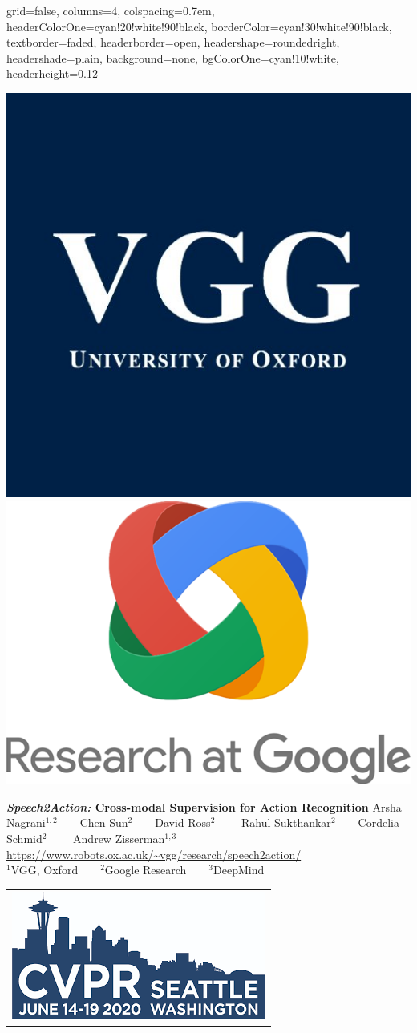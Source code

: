 \documentclass[landscape,a0paper,fontscale=0.292]{baposter}
\begin{document}
\begin{poster}{
 grid=false,
 columns=4,
 colspacing=0.7em,
 headerColorOne=cyan!20!white!90!black,
 borderColor=cyan!30!white!90!black,
 textborder=faded,
 headerborder=open,
 headershape=roundedright,
 headershade=plain,
 background=none,
 bgColorOne=cyan!10!white,
 headerheight=0.12\textheight}
 {
      \includegraphics[width=0.07\linewidth]{VGG_logo.jpg}
      \makebox[0.005\textwidth]{} 
      \includegraphics[width=0.08\linewidth]{Google_Research.png}
      
    
 }
 {\sc\huge\bf \textit{Speech2Action:} Cross-modal Supervision for Action Recognition}
 {Arsha Nagrani$^{1,2}$~~~~Chen Sun$^2$~~~~David Ross$^2$ ~~~~Rahul Sukthankar$^2$~~~~Cordelia Schmid$^{2}$ ~~~~Andrew Zisserman$^{1,3}$ \\[0.2em]
 \small{\url{https://www.robots.ox.ac.uk/~vgg/research/speech2action/}}\\[0.2em]
$^1$VGG, Oxford~~~~$^2$Google Research~~~~$^3$DeepMind~~~~  }
 {
  \begin{tabular}{r}
    \includegraphics[width=0.12\linewidth]{CVPR_logo_2020.png}
  \end{tabular}
 }



\end{poster}
\end{document}
